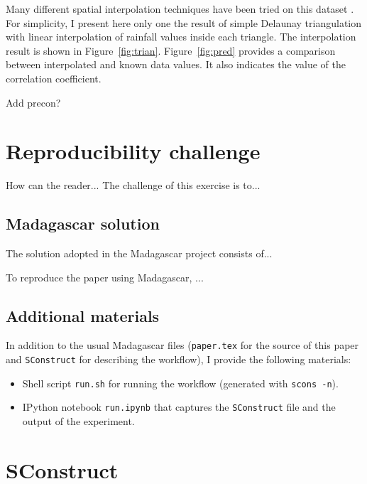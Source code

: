 
Many different spatial interpolation techniques have been tried on
this dataset \cite[]{dubois,Fomel.sepphd.107}. For simplicity, I
present here only one the result of simple Delaunay triangulation with
linear interpolation of rainfall values inside each triangle. The
interpolation result is shown in
Figure~\ref{fig:trian}. Figure~\ref{fig:pred} provides a comparison
between interpolated and known data values. It also indicates the
value of the correlation coefficient.



Add precon?

\section{Reproducibility challenge}

How can the reader... The challenge of this exercise is to...

\subsection{Madagascar solution}

The solution adopted in the Madagascar project consists of...

To reproduce the paper using Madagascar, ...

\subsection{Additional materials}

In addition to the usual Madagascar files (\texttt{paper.tex} for the
source of this paper and \texttt{SConstruct} for describing the
workflow), I provide the following materials:
\begin{itemize}
\item Shell script \texttt{run.sh} for running the workflow (generated with \texttt{scons -n}).
\item IPython notebook \texttt{run.ipynb} that captures the 
      \texttt{SConstruct} file and the output of the experiment.
\end{itemize}

\appendix
\section{SConstruct}

\lstset{language=python,numbers=left,numberstyle=\tiny,showstringspaces=false}




